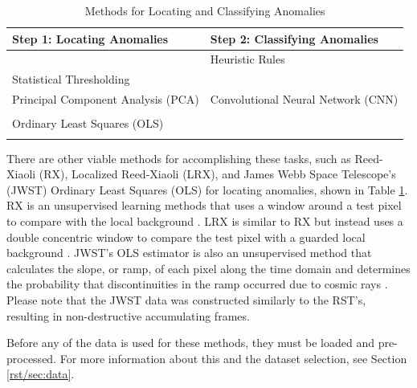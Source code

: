 \begin{table}
    \centering
    \begin{tabular}{|l|l|}
            \hline
        \textbf{Step 1: Locating Anomalies} & \textbf{Step 2: Classifying Anomalies} \\
                \hline
        & Heuristic Rules \\
        Statistical Thresholding& \parencite{cillis2018snowballs} \\
        \hline
        Principal Component Analysis (PCA) & Convolutional Neural Network (CNN)\\
        \parencite{cillis2018snowballs} & \parencite{gu2018recent} \\
        \hline
        Ordinary Least Squares (OLS) & \\
        \parencite{robberto2015cr} & \\
        \hline
    \end{tabular}
    \caption{Methods for Locating and Classifying Anomalies}
    \label{rst/tab:methods}
\end{table}

There are other viable methods for accomplishing these tasks, such as Reed-Xiaoli (RX), Localized Reed-Xiaoli (LRX), and James Webb Space Telescope's (JWST) Ordinary Least Squares (OLS) for locating anomalies, shown in Table \ref{rst/tab:methods}.
RX is an unsupervised learning methods that uses a window around a test pixel to compare with the local background \parencite{reed1990adaptive}.
LRX is similar to RX but instead uses a double concentric window to compare the test pixel with a guarded local background \parencite{molero2013analysis}.
JWST's OLS estimator is also an unsupervised method that calculates the slope, or ramp, of each pixel along the time domain and determines the probability that discontinuities in the ramp occurred due to cosmic rays \parencite{robberto2015cr}.
Please note that the JWST data was constructed similarly to the RST's, resulting in non-destructive accumulating frames. 

Before any of the data is used for these methods, they must be loaded and pre-processed.
For more information about this and the dataset selection, see Section \ref{rst/sec:data}.

